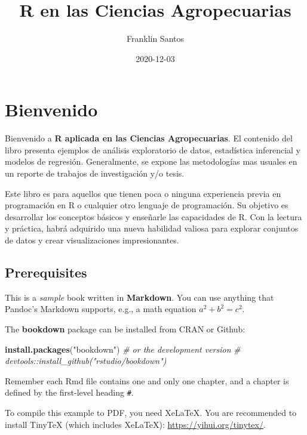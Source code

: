 \documentclass[
]{book}
\title{R en las Ciencias Agropecuarias}
\author{Franklin Santos}
\date{2020-12-03}
\newenvironment{Shaded}{\begin{snugshade}}{\end{snugshade}}
\newcommand{\CommentTok}[1]{\textcolor[rgb]{0.56,0.35,0.01}{\textit{#1}}}
\newcommand{\KeywordTok}[1]{\textcolor[rgb]{0.13,0.29,0.53}{\textbf{#1}}}
\newcommand{\NormalTok}[1]{#1}
\newcommand{\StringTok}[1]{\textcolor[rgb]{0.31,0.60,0.02}{#1}}
\begin{document}
\maketitle

{
\setcounter{tocdepth}{1}
\tableofcontents
}
\hypertarget{bienvenido}{%
\chapter*{Bienvenido}\label{bienvenido}}

Bienvenido a \textbf{R aplicada en las Ciencias Agropecuarias}. El contenido del libro presenta ejemplos de análisis exploratorio de datos, estadística inferencial y modelos de regresión. Generalmente, se expone las metodologías mas usuales en un reporte de trabajos de investigación y/o tesis.

Este libro es para aquellos que tienen poca o ninguna experiencia previa en programación en R o cualquier otro lenguaje de programación. Su objetivo es desarrollar los conceptos básicos y enseñarle las capacidades de R. Con la lectura y práctica, habrá adquirido una nueva habilidad valiosa para explorar conjuntos de datos y crear visualizaciones impresionantes.

\hypertarget{prerequisites}{%
\section{Prerequisites}\label{prerequisites}}

This is a \emph{sample} book written in \textbf{Markdown}. You can use anything that Pandoc's Markdown supports, e.g., a math equation \(a^2 + b^2 = c^2\).

The \textbf{bookdown} package can be installed from CRAN or Github:

\begin{Shaded}
\begin{Highlighting}[]
\KeywordTok{install.packages}\NormalTok{(}\StringTok{"bookdown"}\NormalTok{)}
\CommentTok{# or the development version}
\CommentTok{# devtools::install_github("rstudio/bookdown")}
\end{Highlighting}
\end{Shaded}

Remember each Rmd file contains one and only one chapter, and a chapter is defined by the first-level heading \texttt{\#}.

To compile this example to PDF, you need XeLaTeX. You are recommended to install TinyTeX (which includes XeLaTeX): \url{https://yihui.org/tinytex/}.
\end{document}
